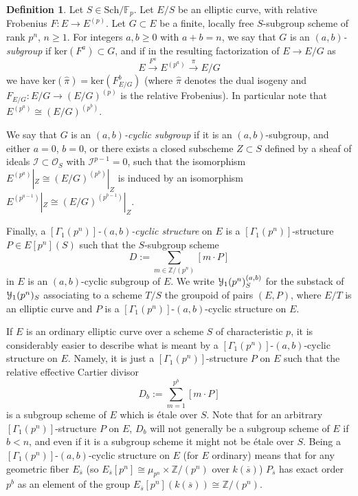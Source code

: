 \documentclass[11pt]{amsart}
\theoremstyle{definition}
\newtheorem{definition}[subsection]{Definition}
\begin{document}
\begin{definition}\label{abcyclic}
Let $S \in \mathrm{Sch}/\mathbb{F}_p$. Let $E/S$ be an elliptic curve, with relative Frobenius $F: E \rightarrow E^{(p)}$. Let $G \subset E$ be a finite, locally free $S$-subgroup scheme of rank $p^n$, $n\geq 1$. For integers $a,b\geq 0$ with $a+b=n$, we say that $G$ is an \textit{$(a,b)$-subgroup} if $\mathrm{ker}(F^a) \subset G$, and if in the resulting factorization of $E \rightarrow E/G$ as 
\begin{displaymath}
E \stackrel{F^a}{\rightarrow} E^{(p^a)} \stackrel{\pi}{\rightarrow} E/G
\end{displaymath}
we have $\mathrm{ker}(\widehat{\pi}) = \mathrm{ker}(F^b_{E/G})$ (where $\widehat{\pi}$ denotes the dual isogeny and $F_{E/G}: E/G \rightarrow (E/G)^{(p)}$ is the relative Frobenius). In particular note that $E^{(p^a)} \cong (E/G)^{(p^b)}$.

We say that $G$ is an \textit{$(a,b)$-cyclic subgroup} if it is an $(a,b)$-subgroup, and either $a=0$, $b=0$, or there exists a closed subscheme $Z \subset S$ defined by a sheaf of ideals $\mathcal{I} \subset \mathcal{O}_S$ with $\mathcal{I}^{p-1} = 0$, such that the isomorphism $E^{(p^a)}|_Z \cong (E/G)^{(p^b)}|_Z$ is induced by an isomorphism $E^{(p^{a-1})}|_Z \cong (E/G)^{(p^{b-1})}|_Z$.

Finally, a \textit{$[\Gamma_1(p^n)]$-$(a,b)$-cyclic structure} on $E$ is a $[\Gamma_1(p^n)]$-structure $P \in E[p^n](S)$ such that the $S$-subgroup scheme 
\begin{displaymath}
D := \sum_{m \in \mathbb{Z}/(p^n)} [m\cdot P]
\end{displaymath}
in $E$ is an $(a,b)$-cyclic subgroup of $E$. We write ${\mathbf{\EuScript{Y}}}_1(p^n)^{(a,b)}_S$ for the substack of ${\mathbf{\EuScript{Y}}}_1(p^n)_S$ associating to a scheme $T/S$ the groupoid of pairs $(E,P)$, where $E/T$ is an elliptic curve and $P$ is a $[\Gamma_1(p^n)]$-$(a,b)$-cyclic structure on $E$.
\end{definition}

If $E$ is an ordinary elliptic curve over a scheme $S$ of characteristic $p$, it is considerably easier to describe what is meant by a $[\Gamma_1(p^n)]$-$(a,b)$-cyclic structure on $E$. Namely, it is just a $[\Gamma_1(p^n)]$-structure $P$ on $E$ such that the relative effective Cartier divisor 
\begin{displaymath}
D_b := \sum_{m = 1}^{p^b} [m\cdot P]
\end{displaymath}
is a subgroup scheme of $E$ which is \'etale over $S$. Note that for an arbitrary $[\Gamma_1(p^n)]$-structure $P$ on $E$, $D_b$ will not generally be a subgroup scheme of $E$ if $b<n$, and even if it is a subgroup scheme it might not be \'etale over $S$. Being a $[\Gamma_1(p^n)]$-$(a,b)$-cyclic structure on $E$ (for $E$ ordinary) means that for any geometric fiber $E_{\overline{s}}$ (so $E_{\overline{s}}[p^n] \cong \mu_{p^n} \times \mathbb{Z}/(p^n)$ over $k(\overline{s})$) $P_{\overline{s}}$ has exact order $p^b$ as an element of the group $E_{\overline{s}}[p^n](k(\overline{s})) \cong \mathbb{Z}/(p^n)$.
\end{document}
